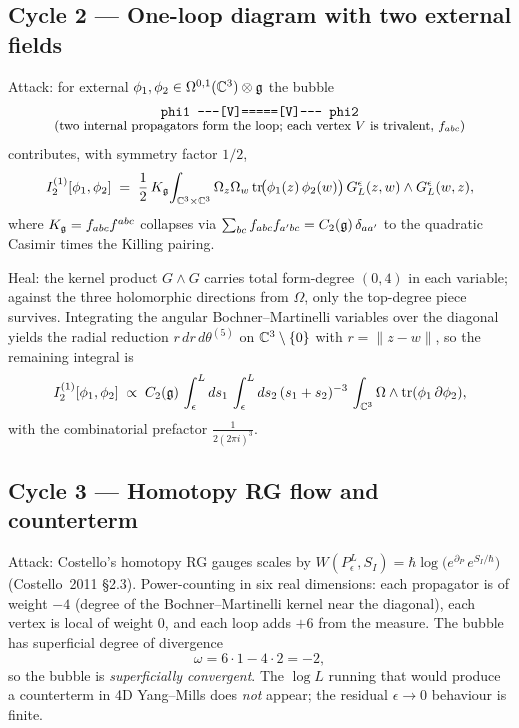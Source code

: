 \subsection{Cycle 2 --- One-loop diagram with two external fields}

Attack: for external $\phi_1,\phi_2 \in \Omega^{0,1}(\mathbb{C}^3)\otimes\mathfrak{g}$
the bubble
\[
\begin{array}{c}
\text{\texttt{%
      phi1 -----[V]=====[V]----- phi2%
 }}\\[-2pt]
\text{\small (two internal propagators form the loop;
 each vertex $V$ is trivalent, $f_{abc}$)}
\end{array}
\]
contributes, with symmetry factor $1/2$,
\[
I_2^{(1)}[\phi_1,\phi_2] \;=\; \frac{1}{2}\,K_{\mathfrak{g}}\!
\int_{\mathbb{C}^3\times\mathbb{C}^3} \Omega_z\Omega_w\,
\mathrm{tr}\!\bigl(\phi_1(z)\,\phi_2(w)\bigr)\,
G_L^\epsilon(z,w)\wedge G_L^\epsilon(w,z),
\]
where $K_{\mathfrak{g}} = f_{abc}f^{abc}$ collapses via
$\sum_{bc} f_{abc}f_{a'bc} = C_2(\mathfrak{g})\,\delta_{aa'}$ to the quadratic
Casimir times the Killing pairing.

Heal: the kernel product $G\wedge G$ carries total form-degree $(0,4)$ in
each variable; against the three holomorphic directions from $\Omega$,
only the top-degree piece survives. Integrating the angular
Bochner--Martinelli variables over the diagonal yields the radial
reduction $r\,dr\,d\theta^{(5)}$ on $\mathbb{C}^3\setminus\{0\}$ with
$r = \|z-w\|$, so the remaining integral is
\[
I_2^{(1)}[\phi_1,\phi_2] \;\propto\; C_2(\mathfrak{g})\,
\int_\epsilon^L ds_1\,\int_\epsilon^L ds_2\,
(s_1+s_2)^{-3}\,
\int_{\mathbb{C}^3}\Omega\wedge \mathrm{tr}(\phi_1\,\partial\phi_2),
\]
with the combinatorial prefactor $\frac{1}{2(2\pi i)^3}$.

\subsection{Cycle 3 --- Homotopy RG flow and counterterm}

Attack: Costello's homotopy RG gauges scales by $W(P_\epsilon^L, S_I) =
\hbar\log\bigl(e^{\partial_{P}}\,e^{S_I/\hbar}\bigr)$ (Costello~2011
\S2.3). Power-counting in six real dimensions: each propagator is of
weight $-4$ (degree of the Bochner--Martinelli kernel near the
diagonal), each vertex is local of weight $0$, and each loop adds $+6$
from the measure. The bubble has superficial degree of divergence
\[
\omega = 6\cdot 1 - 4\cdot 2 = -2,
\]
so the bubble is \emph{superficially convergent}. The $\log L$
running that would produce a counterterm in 4D Yang--Mills does
\emph{not} appear; the residual $\epsilon\to 0$ behaviour is finite.

